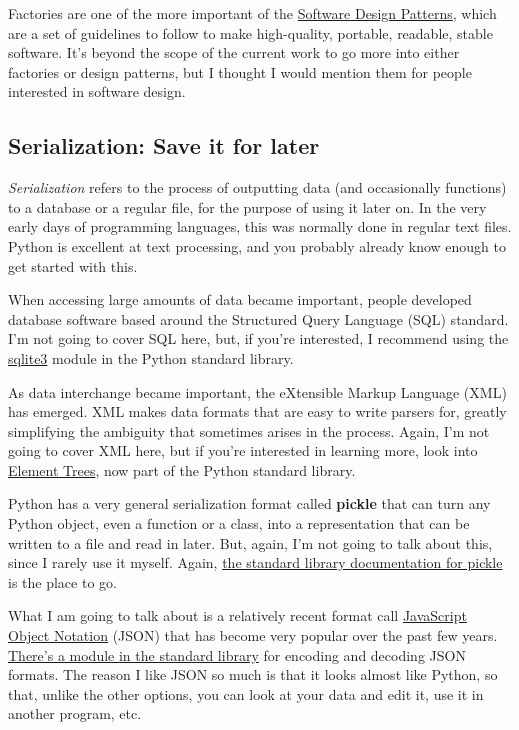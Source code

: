 \documentclass[11pt]{article}
\begin{document}
Factories are one of the more important of the
\href{http://en.wikipedia.org/wiki/Software_design_pattern}{Software
Design Patterns}, which are a set of guidelines to follow to make
high-quality, portable, readable, stable software. It's beyond the scope
of the current work to go more into either factories or design patterns,
but I thought I would mention them for people interested in software
design.

    \subsection{Serialization: Save it for
later}\label{serialization-save-it-for-later}

\emph{Serialization} refers to the process of outputting data (and
occasionally functions) to a database or a regular file, for the purpose
of using it later on. In the very early days of programming languages,
this was normally done in regular text files. Python is excellent at
text processing, and you probably already know enough to get started
with this.

When accessing large amounts of data became important, people developed
database software based around the Structured Query Language (SQL)
standard. I'm not going to cover SQL here, but, if you're interested, I
recommend using the
\href{http://docs.python.org/2/library/sqlite3.html}{sqlite3} module in
the Python standard library.

As data interchange became important, the eXtensible Markup Language
(XML) has emerged. XML makes data formats that are easy to write parsers
for, greatly simplifying the ambiguity that sometimes arises in the
process. Again, I'm not going to cover XML here, but if you're
interested in learning more, look into
\href{http://docs.python.org/2/library/xml.etree.elementtree.html}{Element
Trees}, now part of the Python standard library.

Python has a very general serialization format called \textbf{pickle}
that can turn any Python object, even a function or a class, into a
representation that can be written to a file and read in later. But,
again, I'm not going to talk about this, since I rarely use it myself.
Again,
\href{http://docs.python.org/2/library/pickle.html\#module-cPickle}{the
standard library documentation for pickle} is the place to go.

What I am going to talk about is a relatively recent format call
\href{http://json.org/}{JavaScript Object Notation} (JSON) that has
become very popular over the past few years.
\href{http://docs.python.org/2/library/json.html}{There's a module in
the standard library} for encoding and decoding JSON formats. The reason
I like JSON so much is that it looks almost like Python, so that, unlike
the other options, you can look at your data and edit it, use it in
another program, etc.
\end{document}
